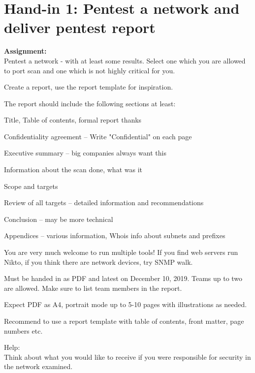 \documentclass[a4paper,11pt,notitlepage]{report}
\begin{document}
\rm
{}

\newcommand{\course}[1]{KEA Kompetence Penetration Testing 2019\\ exercises}




\setcounter{tocdepth}{0}

\normal



\chapter*{Hand-in 1: Pentest a network and deliver pentest report}

{\bf Assignment:}\\
Pentest a network - with at least some results. Select one which you are allowed to port scan and one which is not highly critical for you.

Create a report, use the report template for inspiration.

The report should include the following sections at least:
\begin{list2}
\item Title, Table of contents, formal report thanks
\item Confidentiality agreement -- Write "Confidential" on each page
\item Executive summary -- big companies always want this
\item Information about the scan done, what was it
\item Scope and targets
\item Review of all targets -- detailed information and recommendations
\item Conclusion -- may be more technical
\item Appendices -- various information, Whois info about subnets and prefixes
\end{list2}

You are very much welcome to run multiple tools! If you find web servers run Nikto, if you think there are network devices, try SNMP walk.

Must be handed in as PDF and latest on December 10, 2019. Teams up to two are allowed. Make sure to list team members in the report.

Expect PDF as A4, portrait mode up to 5-10 pages with illustrations as needed.

Recommend to use a report template with table of contents, front matter, page numbers etc.


Help:\\
Think about what you would like to receive if you were responsible for security in the network examined.
\end{document}
